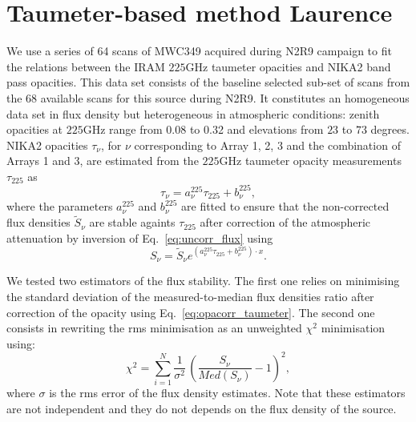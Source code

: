 \section{Taumeter-based method {\color{blue} Laurence}}
\label{se:taumeter-method}

We use a series of 64 scans of MWC349
acquired during N2R9 campaign to fit the relations between the IRAM
$225$GHz taumeter opacities and NIKA2 band pass opacities. This data
set consists of the baseline selected sub-set of scans from the 68
available scans for this source during N2R9. It constitutes an
homogeneous data set in flux density but heterogeneous in atmospheric
conditions: zenith opacities at $225$GHz range from
0.08 to 0.32 and elevations from $23$ to $73$ degrees. NIKA2 opacities
$\tau_\nu$, for $\nu$ corresponding
to Array 1, 2, 3 and the combination of Arrays 1 and 3, are estimated
from the $225$GHz taumeter opacity measurements $\tau_{225}$ as
\begin{equation}  
  \tau_\nu =  a_\nu^{225}\tau_{225} + b_\nu^{225},          
\end{equation}
where the parameters $a_\nu^{225}$ and $b_\nu^{225}$ are fitted to ensure
that the non-corrected flux densities $\tilde{S}_\nu$ are stable againts
$\tau_{225}$ after correction of the atmospheric attenuation by
inversion of Eq.~\ref{eq:uncorr_flux} using 
\begin{equation}  
  S_\nu = \tilde{S}_\nu e^{(a_\nu^{225}\tau_{225} + b_\nu^{225}) \cdot x}.
  \label{eq:opacorr_taumeter}
\end{equation}

We tested two estimators of the flux stability. The first one relies
on minimising the
standard deviation of the measured-to-median flux densities ratio
after correction of the opacity using Eq.~\ref{eq:opacorr_taumeter}. The second
one consists in rewriting the rms minimisation as an unweighted
$\chi^2$ minimisation using:
\begin{equation}
\chi^2 = \sum_{i=1}^{N} \frac{1}{\sigma^2} \, \left( \frac{S_\nu}{Med(S_\nu)} -1 \right)^2,  
\end{equation}
where $\sigma$ is the rms error of the flux density estimates. Note
that these estimators are not independent and they do not depends on
the flux density of the source.  


